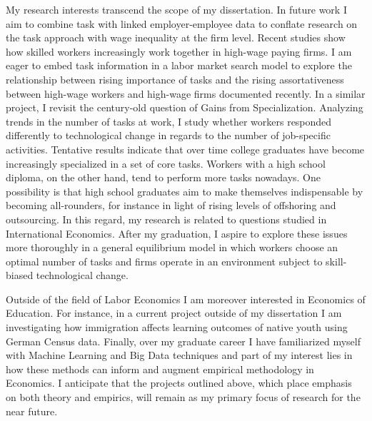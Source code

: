 \documentclass[a4paper,11pt]{article}
\begin{document}

My research interests transcend the scope of my dissertation.  In future work I aim to combine task with linked employer-employee data to conflate research on the task approach with wage inequality at the firm level. Recent studies show how skilled workers increasingly work together in high-wage paying firms. I am eager to embed task information in a labor market search model to explore the relationship between rising importance of tasks and the rising assortativeness between high-wage workers and high-wage firms documented recently. In a similar project, I revisit the century-old question of Gains from Specialization. Analyzing trends in the number of tasks at work, I study whether workers responded differently to technological change in regards to the number of job-specific activities. Tentative results indicate that over time college graduates have become increasingly specialized in a set of core tasks. Workers with a high school diploma, on the other hand, tend to perform more tasks nowadays. One possibility is that high school graduates aim to make themselves indispensable by becoming all-rounders, for instance in light of rising levels of offshoring and outsourcing. In this regard, my research is related to questions studied in International Economics. After my graduation, I aspire to explore these issues more thoroughly in a general equilibrium model in which workers choose an optimal number of tasks and firms operate in an environment subject to skill-biased technological change.

Outside of the field of Labor Economics I am moreover interested in Economics of Education. For instance, in a current project outside of my dissertation I am investigating how immigration affects learning outcomes of native youth using German Census data. Finally, over my graduate career I have familiarized myself with Machine Learning and Big Data techniques and part of my interest lies in how these methods can inform and augment empirical methodology in Economics. I anticipate that the projects outlined above, which place emphasis on both theory and empirics, will remain as my primary focus of research for the near future. 
\end{document}
